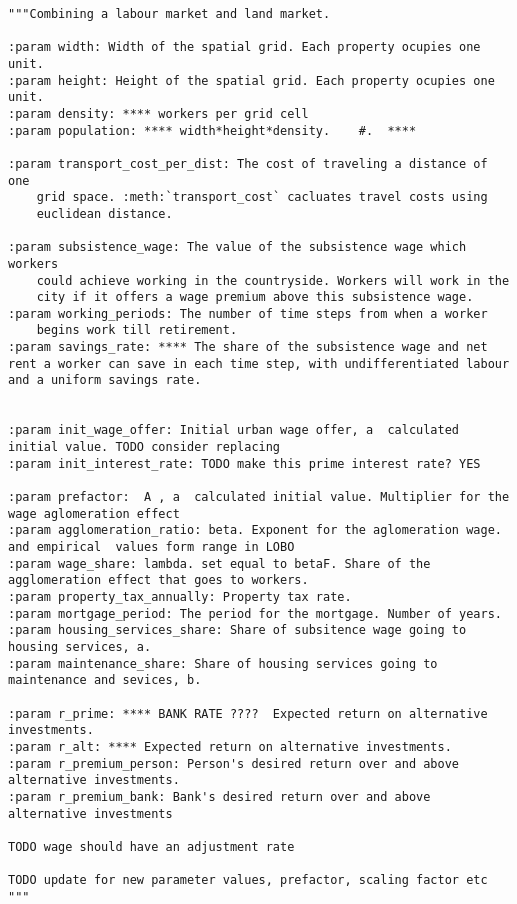 \begin{lstlisting}
"""Combining a labour market and land market.

:param width: Width of the spatial grid. Each property ocupies one unit.
:param height: Height of the spatial grid. Each property ocupies one unit.
:param density: **** workers per grid cell
:param population: **** width*height*density.    #.  ****

:param transport_cost_per_dist: The cost of traveling a distance of one
    grid space. :meth:`transport_cost` cacluates travel costs using
    euclidean distance.
    
:param subsistence_wage: The value of the subsistence wage which workers
    could achieve working in the countryside. Workers will work in the
    city if it offers a wage premium above this subsistence wage.
:param working_periods: The number of time steps from when a worker
    begins work till retirement.
:param savings_rate: **** The share of the subsistence wage and net rent a worker can save in each time step, with undifferentiated labour and a uniform savings rate.


:param init_wage_offer: Initial urban wage offer, a  calculated initial value. TODO consider replacing
:param init_interest_rate: TODO make this prime interest rate? YES

:param prefactor:  A , a  calculated initial value. Multiplier for the wage aglomeration effect 
:param agglomeration_ratio: beta. Exponent for the aglomeration wage. and empirical  values form range in LOBO
:param wage_share: lambda. set equal to betaF. Share of the agglomeration effect that goes to workers.
:param property_tax_annually: Property tax rate.
:param mortgage_period: The period for the mortgage. Number of years.
:param housing_services_share: Share of subsitence wage going to housing services, a.
:param maintenance_share: Share of housing services going to maintenance and sevices, b.

:param r_prime: **** BANK RATE ????  Expected return on alternative investments.
:param r_alt: **** Expected return on alternative investments.
:param r_premium_person: Person's desired return over and above alternative investments.
:param r_premium_bank: Bank's desired return over and above alternative investments

TODO wage should have an adjustment rate

TODO update for new parameter values, prefactor, scaling factor etc
"""
\end{lstlisting}

